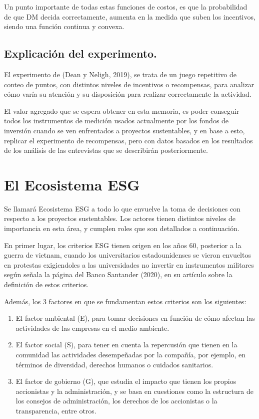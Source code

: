 \documentclass[11pt,letterpaper]{article}
\begin{document}
Un punto importante de todas estas funciones de costos, es que la probabilidad de que DM decida correctamente, aumenta en la medida que suben los incentivos, siendo una función continua y convexa.

\subsection{Explicación del experimento.}

El experimento de (Dean y Neligh, 2019), se trata de un juego repetitivo de conteo de puntos, con distintos niveles de incentivos o recompensas, para analizar cómo varía su atención y su disposición para realizar correctamente la actividad. 

El valor agregado que se espera obtener en esta memoria, es poder conseguir todos los instrumentos de medición usados actualmente por los fondos de inversión cuando se ven enfrentados a proyectos sustentables, y en base a esto, replicar el experimento de recompensas, pero con datos basados en los resultados de los análisis de las entrevistas que se describirán posteriormente.

\section{El Ecosistema ESG}

Se llamará Ecosistema ESG a todo lo que envuelve la toma de decisiones con respecto a los proyectos sustentables. Los actores tienen distintos niveles de importancia en esta área, y cumplen roles que son detallados a continuación. 

En primer lugar, los criterios ESG tienen origen en los años 60, posterior a la guerra de vietnam, cuando los universitarios estadounidenses se vieron envueltos en protestas exigiendoles a las universidades no invertir en instrumentos militares según señala la página del Banco Santander (2020), en su artículo sobre la definición de estos criterios. 

Además, los 3 factores en que se fundamentan estos criterios son los siguientes:

\begin{enumerate}

\item El factor ambiental (E), para tomar decisiones en función de cómo afectan las actividades de las empresas en el medio ambiente.
\item El factor social (S), para tener en cuenta la repercusión que tienen en la comunidad las actividades desempeñadas por la compañía, por ejemplo, en términos de diversidad, derechos humanos o cuidados sanitarios.
\item El factor de gobierno (G), que estudia el impacto que tienen los propios accionistas y la administración, y se basa en cuestiones como la estructura de los consejos de administración, los derechos de los accionistas o la transparencia, entre otros.

\end{enumerate}
\end{document}
